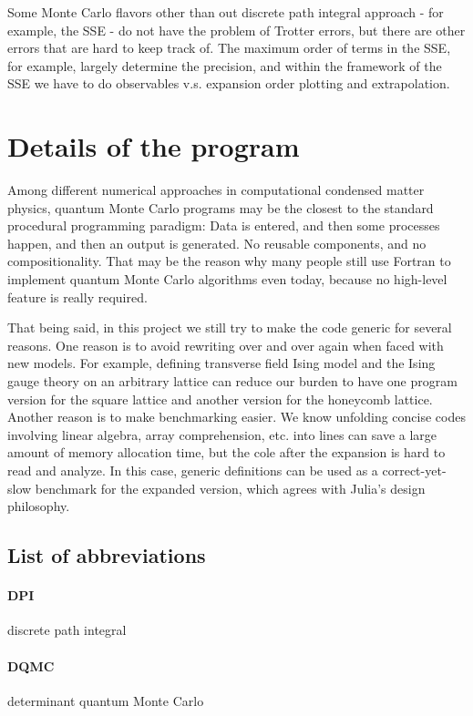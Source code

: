 \documentclass[hyperref, a4paper]{article}
\newcommand*{\tfim}{transverse field Ising model}
\begin{document}
Some Monte Carlo flavors other than out discrete path integral approach - for example, the SSE - do not have the problem of Trotter errors, but there are other errors that are hard to keep track of.
The maximum order of terms in the SSE, for example, largely determine the precision, and within the framework of the SSE we have to do observables v.s. expansion order plotting and extrapolation.

\section{Details of the program}

Among different numerical approaches in computational condensed matter physics, 
quantum Monte Carlo programs may be the closest to the standard procedural programming paradigm:
Data is entered, and then some processes happen, and then an output is generated.
No reusable components, and no compositionality.
That may be the reason why many people still use Fortran to implement quantum Monte Carlo algorithms even today,
because no high-level feature is really required.

That being said, in this project we still try to make the code generic for several reasons.
One reason is to avoid rewriting over and over again when faced with new models. 
For example, defining \tfim{} and the Ising gauge theory on an arbitrary lattice can reduce our burden to have one program version for the square lattice and another version for the honeycomb lattice.
Another reason is to make benchmarking easier. 
We know unfolding concise codes involving linear algebra, array comprehension, etc. into lines can save a large amount of memory allocation time,
but the cole after the expansion is hard to read and analyze.
In this case, generic definitions can be used as a correct-yet-slow benchmark for the expanded version, which agrees with Julia's design philosophy.

\subsection{List of abbreviations}

\paragraph{DPI} discrete path integral
\paragraph{DQMC} determinant quantum Monte Carlo
\end{document}
